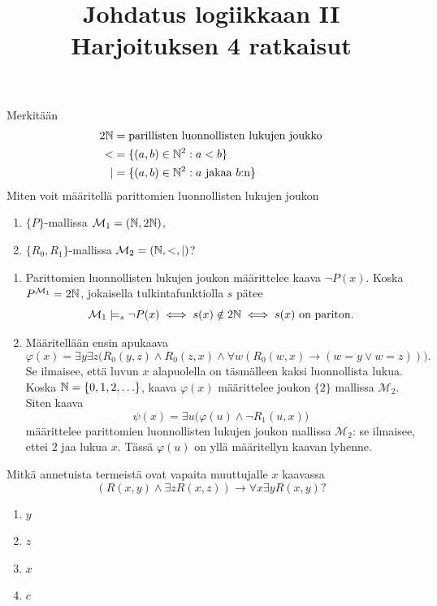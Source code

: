 \documentclass[11pt,a4paper]{amsart}
\title{Johdatus logiikkaan II\\Harjoituksen 4 ratkaisut}
\author{}
\date{}
\begin{document}

\begin{exercise}
  Merkitään
  \[
    \begin{aligned}
      2\mathbb{N} &= \text{parillisten luonnollisten lukujen joukko} \\
      < &= \{(a,b) \in \mathbb{N}^2 : a < b\} \\
      \mid &= \{(a,b) \in \mathbb{N}^2 : a \text{ jakaa } b\text{:n}\}
    \end{aligned}
  \]
  Miten voit määritellä parittomien luonnollisten lukujen joukon
  \leavevmode\par
  \begin{enumerate}[label=(\alph*)]
    \item \(\{P\}\)-mallissa \(\mathcal M_1 = (\mathbb{N},2\mathbb{N})\),
    \item \(\{R_0,R_1\}\)-mallissa \(\mathcal M_2 = (\mathbb{N},<,\mid)\)?
  \end{enumerate}
\end{exercise}

\begin{solution}
  \leavevmode\par
  \begin{enumerate}[label=(\alph*)]
    \item Parittomien luonnollisten lukujen joukon määrittelee kaava
      \(\neg P(x)\). Koska \(P^{\mathcal M_1}=2\mathbb{N}\), jokaisella
      tulkintafunktiolla \(s\) pätee
      \[
        \mathcal M_1\models_s\neg P(x)
        \iff s(x)\notin 2\mathbb{N}
        \iff s(x)\text{ on pariton}.
      \]

    \item Määritellään ensin apukaava
      \[
        \varphi(x)=\exists y\exists z\bigl(
          R_0(y,z)\land R_0(z,x)\land
        \forall w(R_0(w,x)\to(w=y\lor w=z))\bigr).
      \]
      Se ilmaisee, että luvun \(x\) alapuolella on täsmälleen kaksi
      luonnollista lukua. Koska \(\mathbb{N}=\{0,1,2,\ldots\}\), kaava
      \(\varphi(x)\) määrittelee joukon \(\{2\}\) mallissa
      \(\mathcal M_2\). Siten kaava
      \[
        \psi(x)=\exists u\bigl(\varphi(u)\land\neg R_1(u,x)\bigr)
      \]
      määrittelee parittomien luonnollisten lukujen joukon mallissa
      \(\mathcal M_2\): se ilmaisee, ettei \(2\) jaa lukua \(x\).
      Tässä \(\varphi(u)\) on yllä määritellyn kaavan lyhenne.
  \end{enumerate}
\end{solution}

\begin{exercise}
  Mitkä annetuista termeistä ovat vapaita muuttujalle \(x\) kaavassa
  \[
    (R(x,y) \land \exists zR(x,z)) \to \forall x\exists yR(x,y)?
  \]
  \leavevmode\par
  \begin{enumerate}[label=(\alph*)]
    \item \(y\)
    \item \(z\)
    \item \(x\)
    \item \(c\)
  \end{enumerate}
\end{exercise}
\end{document}
